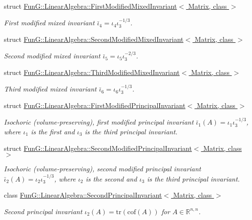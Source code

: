 \begin{DoxyCompactItemize}
struct \hyperlink{structFunG_1_1LinearAlgebra_1_1FirstModifiedMixedInvariant}{Fun\-G\-::\-Linear\-Algebra\-::\-First\-Modified\-Mixed\-Invariant$<$ Matrix, class $>$}
\begin{DoxyCompactList}\small\item\em First modified mixed invariant $\bar\iota_4=\iota_4\iota_3^{-1/3}$. \end{DoxyCompactList}\item 
struct \hyperlink{structFunG_1_1LinearAlgebra_1_1SecondModifiedMixedInvariant}{Fun\-G\-::\-Linear\-Algebra\-::\-Second\-Modified\-Mixed\-Invariant$<$ Matrix, class $>$}
\begin{DoxyCompactList}\small\item\em Second modified mixed invariant $\bar\iota_5=\iota_5\iota_3^{-2/3}$. \end{DoxyCompactList}\item 
struct \hyperlink{structFunG_1_1LinearAlgebra_1_1ThirdModifiedMixedInvariant}{Fun\-G\-::\-Linear\-Algebra\-::\-Third\-Modified\-Mixed\-Invariant$<$ Matrix, class $>$}
\begin{DoxyCompactList}\small\item\em Third modified mixed invariant $\bar\iota_6=\iota_6\iota_3^{-1/3}$. \end{DoxyCompactList}\item 
struct \hyperlink{structFunG_1_1LinearAlgebra_1_1FirstModifiedPrincipalInvariant}{Fun\-G\-::\-Linear\-Algebra\-::\-First\-Modified\-Principal\-Invariant$<$ Matrix, class $>$}
\begin{DoxyCompactList}\small\item\em Isochoric (volume-\/preserving), first modified principal invariant $ \bar\iota_1(A)=\iota_1\iota_3^{-1/3} $, where $\iota_1$ is the first and $\iota_3$ is the third principal invariant. \end{DoxyCompactList}\item 
struct \hyperlink{structFunG_1_1LinearAlgebra_1_1SecondModifiedPrincipalInvariant}{Fun\-G\-::\-Linear\-Algebra\-::\-Second\-Modified\-Principal\-Invariant$<$ Matrix, class $>$}
\begin{DoxyCompactList}\small\item\em Isochoric (volume-\/preserving), second modified principal invariant $ \bar\iota_2(A)=\iota_2\iota_3^{-1/3} $, where $\iota_2$ is the second and $\iota_3$ is the third principal invariant. \end{DoxyCompactList}\item 
class \hyperlink{classFunG_1_1LinearAlgebra_1_1SecondPrincipalInvariant}{Fun\-G\-::\-Linear\-Algebra\-::\-Second\-Principal\-Invariant$<$ Matrix, class $>$}
\begin{DoxyCompactList}\small\item\em Second principal invariant $ \iota_2(A)=\mathrm{tr}(\mathrm{cof}(A)) $ for $A\in\mathbb{R}^{n,n}$. \end{DoxyCompactList}\end{DoxyCompactItemize}
